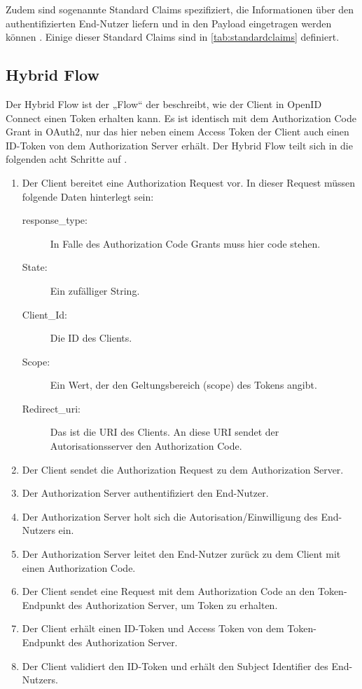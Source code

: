Zudem sind sogenannte Standard Claims spezifiziert, die Informationen über den 
authentifizierten End-Nutzer liefern und in den Payload eingetragen werden können \citep{openidconnect:2014}.  
Einige dieser Standard Claims sind in \autoref{tab:standardclaims} definiert. 

\subsection{Hybrid Flow}
\label{subsec:OpenIDConnect:HybridFlow}
Der Hybrid Flow ist der „Flow“ der beschreibt, wie der Client in OpenID Connect einen
Token erhalten kann. Es ist identisch mit dem Authorization Code Grant in OAuth2, nur 
das hier neben einem Access Token der Client auch einen ID-Token von dem Authorization 
Server erhält. Der Hybrid Flow teilt sich in die folgenden acht Schritte auf \citep{openidconnect:2014}.

\begin{enumerate}
  \item Der Client bereitet eine Authorization Request vor. In dieser Request müssen folgende Daten hinterlegt sein:
    \begin{description}
      \item[response\_type:] In Falle des Authorization Code Grants muss hier code stehen. 
      \item[State:] Ein zufälliger String. 
      \item[Client\_Id:] Die ID des Clients. 
      \item[Scope:] Ein Wert, der den Geltungsbereich (scope) des Tokens angibt. 
      \item[Redirect\_uri:] Das ist die URI des Clients. An diese URI sendet der Autorisationsserver den Authorization Code. 
    \end{description}
  \item Der Client sendet die Authorization Request zu dem Authorization Server.
  \item Der Authorization Server authentifiziert den End-Nutzer. 
  \item Der Authorization Server holt sich die Autorisation/Einwilligung des End-Nutzers ein. 
  \item Der Authorization Server leitet den End-Nutzer zurück zu dem Client mit 
  einen Authorization Code.
  \item Der Client sendet eine Request mit dem Authorization Code an den Token-Endpunkt des Authorization Server, um Token zu erhalten. 
  \item Der Client erhält einen ID-Token und Access Token von dem Token-Endpunkt des Authorization Server.
  \item Der Client validiert den ID-Token und erhält den Subject Identifier des End-Nutzers.    
\end{enumerate}

